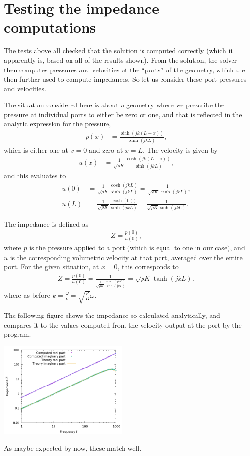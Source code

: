 \documentclass{article}
\begin{document}
\section{Testing the impedance computations}

The tests above all checked that the solution is computed correctly
(which it apparently is, based on all of the results shown). From the
solution, the solver then computes pressures and velocities at the
``ports'' of the geometry, which are then further used to compute
impedances. So let us consider these port pressures and velocities.

The situation considered here is about a geometry where we prescribe
the pressure at individual ports to either be zero or one, and that is
reflected in the analytic expression for the pressure,
\begin{align*}
  p(x)
  &=
  \frac{\sinh(jk(L-x))}{\sinh(jkL)},
\end{align*}
which is either one at $x=0$ and zero at $x=L$. The velocity is given by
\begin{align*}
  u(x)
  &=
  \frac{1}{\sqrt{\rho K}}
  \frac{\cosh(jk(L-x))}{\sinh(jkL)},
\end{align*}
and this evaluates to
\begin{align*}
  u(0)
  &=
  \frac{1}{\sqrt{\rho K}}
  \frac{\cosh(jkL)}{\sinh(jkL)}
  =
  \frac{1}{\sqrt{\rho K}\tanh(jkL)},
\\
  u(L)
  &=
  \frac{1}{\sqrt{\rho K}}
  \frac{\cosh(0))}{\sinh(jkL)}
  =
  \frac{1}{\sqrt{\rho K}\sinh(jkL)}.
\end{align*}

The impedance is defined as 
\begin{align*}
  Z = \frac{p(0)}{u(0)},
\end{align*}
where $p$ is the pressure applied to a port (which is equal to one in
our case), and $u$ is the corresponding volumetric velocity at that
port, averaged over the entire port. For the given situation, at
$x=0$, this corresponds to
\begin{align*}
  Z = \frac{p(0)}{u(0)} 
  = 
  \frac{1}
  {\frac{1}{\sqrt{\rho K}}
  \frac{\cosh(jkL)}{\sinh(jkL)}}
  = 
  \sqrt{\rho K}\tanh(jkL),
\end{align*}
where as before $k=\frac{\omega}{c}=\sqrt{\frac{\rho}{K}}\omega$.

The following figure shows the impedance so calculated analytically,
and compares it to the values computed from the velocity output at the
port by the program.
\begin{center}
\includegraphics[width=0.48\textwidth]{wave-guide-tet-real-material-jasons-mesh-0/impedance.png}
\end{center}
As maybe expected by now, these match well.
\end{document}
